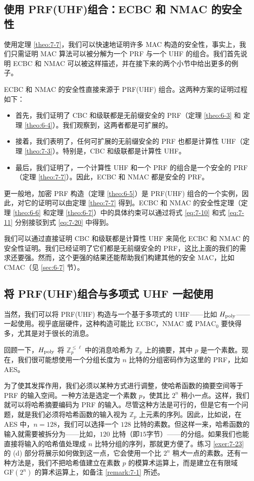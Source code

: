 \subsection{使用 PRF(UHF)组合：ECBC 和 NMAC 的安全性}\label{subsec:7-3-1}

使用定理 \ref{theo:7-7}，我们可以快速地证明许多 MAC 构造的安全性，事实上，我们只需证明 MAC 算法可以被分解为一个 PRF 与一个 UHF 的组合。我们首先说明 ECBC 和 NMAC 可以被这样描述，并在接下来的两个小节中给出更多的例子。

ECBC 和 NMAC 的安全性直接来源于 PRF(UHF) 组合。这两种方案的证明过程如下：
\begin{itemize}
	\item 首先，我们证明了 CBC 和级联都是无前缀安全的 PRF（定理 \ref{theo:6-3} 和 定理 \ref{theo:6-4}）。我们观察到，这两者都是可扩展的。
	\item 接着，我们表明了，任何可扩展的无前缀安全的 PRF 也都是计算性 UHF（定理 \ref{theo:7-3}）。特别是，CBC 和级联都是计算性 UHF。
	\item 最后，我们证明了，一个计算性 UHF 和一个 PRF 的组合是一个安全的 PRF（定理 \ref{theo:7-7}）。因此，ECBC 和 NMAC 都是安全的 PRF。
\end{itemize}
更一般地，加密 PRF 构造（定理 \ref{theo:6-5}）是 PRF(UHF) 组合的一个实例，因此，对它的证明可以由定理 \ref{theo:7-7} 得到。ECBC 和 NMAC 的安全性定理（定理 \ref{theo:6-6} 和定理 \ref{theo:6-7}）中的具体约束可以通过将式 \ref{eq:7-10} 和式 \ref{eq:7-11} 分别接驳到式 \ref{eq:7-20} 中得到。

我们可以通过直接证明 CBC 和级联都是计算性 UHF 来简化 ECBC 和 NMAC 的安全性证明。我们已经证明了它们都是无前缀安全的 PRF，这比上面的我们的需求还要强。然而，这个更强的结果还能帮助我们构建其他的安全 MAC，比如 CMAC（见 \ref{sec:6-7} 节）。

\subsection{将 PRF(UHF)组合与多项式 UHF 一起使用}\label{subsec:7-3-2}

当然，我们可以将 PRF(UHF) 构造与一个基于多项式的 UHF——比如 $H_{\rm poly}$——一起使用。视乎底层硬件，这种构造可能比 ECBC，NMAC 或 $\mathrm{PMAC}_0$ 要快得多，尤其是对于很长的消息。

回顾一下，$H_{\rm poly}$ 将 $\mathbb{Z}^{\leq\ell}_p$ 中的消息哈希为 $\mathbb{Z}_p$ 上的摘要，其中 $p$ 是一个素数。现在，我们很可能想使用一个分组长度为 $n$ 比特的分组密码作为这里的 PRF，比如 AES。

为了使其发挥作用，我们必须以某种方式进行调整，使哈希函数的摘要空间等于 PRF 的输入空间。一种方法是选定一个素数 $p$，使其比 $2^n$ 稍小一点。这样，我们就可以将哈希摘要编码为 PRF 的输入。尽管这种方法是可行的，但是它有一个问题，就是我们必须将哈希函数的输入视为 $\mathbb{Z}_p$ 上元素的序列。因此，比如说，在 AES 中，$n=128$，我们可以选择一个 $128$ 比特的素数。但这样一来，哈希函数的输入就需要被拆分为——比如，$120$ 比特（即$15$字节）——的分组。如果我们也能直接将输入的哈希值处理成 $n$ 比特分组的序列，那就更方便了。练习 \ref{exer:7-23} 的 (d) 部分将展示如何做到这一点，它会使用一个比 $2^n$ 稍\emph{大}一点的素数。还有一种方法是，我们不把哈希值建立在素数 $p$ 的模算术运算上，而是建立在有限域 $\mathrm{GF}(2^n)$ 的算术运算上，如备注 \ref{remark:7-1} 所述。


